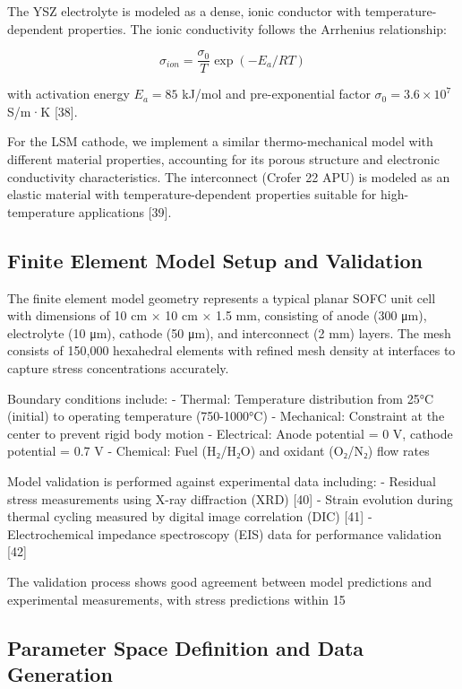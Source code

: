 \documentclass[10pt,conference]{IEEEtran}
\begin{document}
The YSZ electrolyte is modeled as a dense, ionic conductor with temperature-dependent properties. The ionic conductivity follows the Arrhenius relationship:

\begin{equation}
\sigma_{ion} = \frac{\sigma_0}{T} \exp(-E_a/RT)
\end{equation}

with activation energy $E_a = 85$ kJ/mol and pre-exponential factor $\sigma_0 = 3.6 \times 10^7$ S/m·K [38].

For the LSM cathode, we implement a similar thermo-mechanical model with different material properties, accounting for its porous structure and electronic conductivity characteristics. The interconnect (Crofer 22 APU) is modeled as an elastic material with temperature-dependent properties suitable for high-temperature applications [39].

\subsection{Finite Element Model Setup and Validation}

The finite element model geometry represents a typical planar SOFC unit cell with dimensions of 10 cm × 10 cm × 1.5 mm, consisting of anode (300 μm), electrolyte (10 μm), cathode (50 μm), and interconnect (2 mm) layers. The mesh consists of 150,000 hexahedral elements with refined mesh density at interfaces to capture stress concentrations accurately.

Boundary conditions include:
- Thermal: Temperature distribution from 25°C (initial) to operating temperature (750-1000°C)
- Mechanical: Constraint at the center to prevent rigid body motion
- Electrical: Anode potential = 0 V, cathode potential = 0.7 V
- Chemical: Fuel (H₂/H₂O) and oxidant (O₂/N₂) flow rates

Model validation is performed against experimental data including:
- Residual stress measurements using X-ray diffraction (XRD) [40]
- Strain evolution during thermal cycling measured by digital image correlation (DIC) [41]
- Electrochemical impedance spectroscopy (EIS) data for performance validation [42]

The validation process shows good agreement between model predictions and experimental measurements, with stress predictions within 15%

\subsection{Parameter Space Definition and Data Generation}
\end{document}
